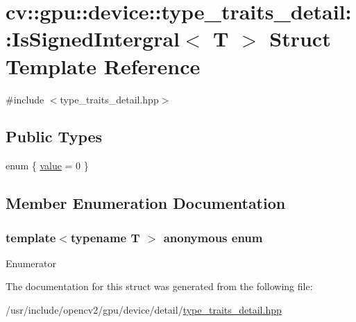 \hypertarget{structcv_1_1gpu_1_1device_1_1type__traits__detail_1_1IsSignedIntergral}{\section{cv\-:\-:gpu\-:\-:device\-:\-:type\-\_\-traits\-\_\-detail\-:\-:Is\-Signed\-Intergral$<$ T $>$ Struct Template Reference}
\label{structcv_1_1gpu_1_1device_1_1type__traits__detail_1_1IsSignedIntergral}
}


{\ttfamily \#include $<$type\-\_\-traits\-\_\-detail.\-hpp$>$}

\subsection*{Public Types}
\begin{DoxyCompactItemize}
\item 
enum \{ \hyperlink{structcv_1_1gpu_1_1device_1_1type__traits__detail_1_1IsSignedIntergral_a7ad87317a6b92f20ff581cc0a0ab25a0ae50237fc1c99552f175e5cf334ec763b}{value} = 0
 \}
\end{DoxyCompactItemize}


\subsection{Member Enumeration Documentation}
\hypertarget{structcv_1_1gpu_1_1device_1_1type__traits__detail_1_1IsSignedIntergral_a7ad87317a6b92f20ff581cc0a0ab25a0}{\subsubsection[{anonymous enum}]{\setlength{\rightskip}{0pt plus 5cm}template$<$typename T $>$ anonymous enum}}\label{structcv_1_1gpu_1_1device_1_1type__traits__detail_1_1IsSignedIntergral_a7ad87317a6b92f20ff581cc0a0ab25a0}
\begin{Desc}
\item[Enumerator]\par
\begin{description}
\item[{\em 
\hypertarget{structcv_1_1gpu_1_1device_1_1type__traits__detail_1_1IsSignedIntergral_a7ad87317a6b92f20ff581cc0a0ab25a0ae50237fc1c99552f175e5cf334ec763b}{value}\label{structcv_1_1gpu_1_1device_1_1type__traits__detail_1_1IsSignedIntergral_a7ad87317a6b92f20ff581cc0a0ab25a0ae50237fc1c99552f175e5cf334ec763b}
}]\end{description}
\end{Desc}


The documentation for this struct was generated from the following file\-:\begin{DoxyCompactItemize}
\item 
/usr/include/opencv2/gpu/device/detail/\hyperlink{type__traits__detail_8hpp}{type\-\_\-traits\-\_\-detail.\-hpp}\end{DoxyCompactItemize}
